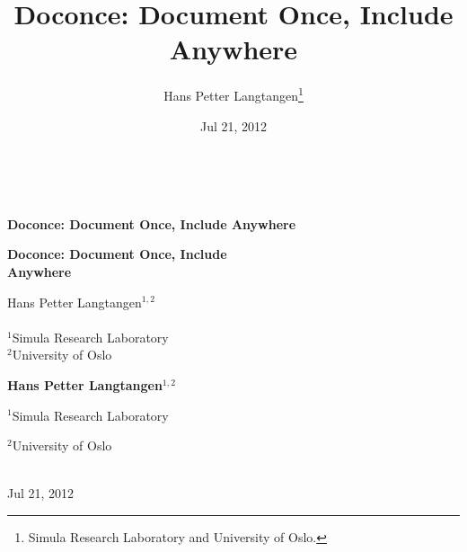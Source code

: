 \documentclass{book}
\begin{document}


\title{Doconce: Document Once, Include Anywhere}


\thispagestyle{empty}
\hbox{\ \ }
\vfill
\begin{center}
{\huge{\bfseries{Doconce: Document Once, Include Anywhere}}}


\begin{center}
{\LARGE\bf Doconce: Document Once, Include \\ [1.5mm] Anywhere}
\end{center}




\author{Hans Petter Langtangen\footnote{Simula Research Laboratory and University of Oslo.}}

\vspace{1.3cm}

{\Large\textsf{Hans Petter Langtangen${}^{1, 2}$}}\\ [3mm]

\ \\ [2mm]

{\large\textsf{${}^1$Simula Research Laboratory} \\ [1.5mm]}
{\large\textsf{${}^2$University of Oslo} \\ [1.5mm]}


\begin{center}
{\bf Hans Petter Langtangen${}^{1, 2}$} \\ [0mm]
\end{center}

\begin{center}
\centerline{{\small ${}^1$Simula Research Laboratory}}
\centerline{{\small ${}^2$University of Oslo}}
\end{center}





\date{Jul 21, 2012}
\maketitle


\ \\ [10mm]
{\large\textsf{Jul 21, 2012}}

\end{center}
\vfill
\clearpage
\end{document}
